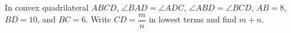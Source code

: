 In convex quadrilateral $ABCD$, $\angle BAD=\angle ADC$, $\angle ABD=\angle BCD$, $AB=8$, $BD=10$, and $BC=6$. Write $CD=\dfrac{m}{n}$ in lowest terms and find $m+n$.

